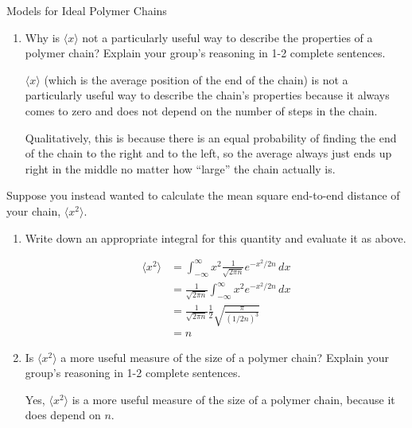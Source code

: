 \begin{activity}{Models for Ideal Polymer Chains}
\begin{ctqs}
\begin{enumerate}
			\item Why is $\langle x \rangle$ not a particularly useful way to describe the properties of a polymer chain?  Explain your group's reasoning in 1-2 complete sentences.
				
				\begin{solution}[1.5in]{}
					$\langle x \rangle$ (which is the average position of the end of the chain) is not a particularly useful way to describe the chain's properties because it always comes to zero and does not depend on the number of steps in the chain.  
					
					Qualitatively, this is because there is an equal probability of finding the end of the chain to the right and to the left, so the average always just ends up right in the middle no matter how ``large'' the chain actually is.
				\end{solution}
			
		\end{enumerate}
		
	\question Suppose you instead wanted to calculate the mean square end-to-end distance of your chain, $\langle x^2\rangle$.
	
		\begin{enumerate}
			\item Write down an appropriate integral for this quantity and evaluate it as above.
				
				\begin{solution}[1.5in]{}
					\begin{align*}
						\langle x^2 \rangle &= \int_{-\infty}^\infty x^2 \frac{1}{\sqrt{2\pi n}}e^{-x^2/2n}\, dx\\
						&= \frac{1}{\sqrt{2\pi n}} \int_{-\infty}^\infty x^2 e^{-x^2/2n}\, dx\\
						&= \frac{1}{\sqrt{2\pi n}} \frac{1}{2}\sqrt{\frac{\pi}{(1/2n)^3}}\\
						&= n
					\end{align*}
				\end{solution}
			
			\item Is $\langle x^2 \rangle$ a more useful measure of the size of a polymer chain?  Explain your group's reasoning in 1-2 complete sentences.
				
				\begin{solution}[1.5in]{}
				
					Yes, $\langle x^2 \rangle$ is a more useful measure of the size of a polymer chain, because it does depend on $n$.
					

\end{solution}
\end{enumerate}
\end{ctqs}
\end{activity}
